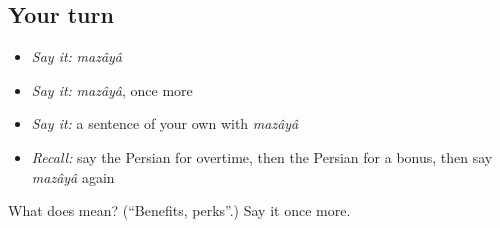 \subsection*{Your turn}
\begin{itemize}
\raggedright
  \item \emph{Say it:} \emph{mazâyâ}
  \item \emph{Say it:} \emph{mazâyâ}, once more
  \item \emph{Say it:} a sentence of your own with \emph{mazâyâ}
  \item \emph{Recall:} say the Persian for overtime, then the Persian for a bonus, then say \emph{mazâyâ} again
\end{itemize}

\begin{tcolorbox}[breakable,colback=teal!4,colframe=teal!35!black,title={Before you move on}]
What does  mean? (\textquotedblleft{}Benefits, perks\textquotedblright{}.) Say it once more.
\end{tcolorbox}
